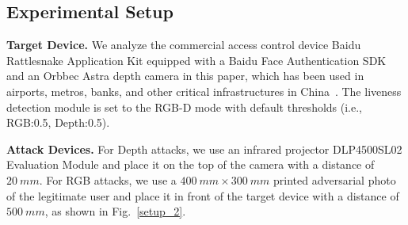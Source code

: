 
\subsection{Experimental Setup}
\textbf{Target Device.} We analyze the commercial access control device Baidu Rattlesnake Application Kit equipped with a Baidu Face Authentication SDK and an Orbbec Astra depth camera in this paper, which has been used in airports, metros, banks, and other critical infrastructures in China~\cite{baidu_customer}.
The liveness detection module is set to the RGB-D mode with default thresholds  (i.e., RGB:0.5, Depth:0.5).

\textbf{Attack Devices.} For Depth attacks, we use an infrared projector DLP4500SL02 Evaluation Module and place it on the top of the camera with a distance of $20~mm$. For RGB attacks, we use a $400~mm\times300~mm$ printed adversarial photo of the legitimate user and place it in front of the target device with a distance of $500~mm$, as shown in Fig.~\ref{setup_2}.


